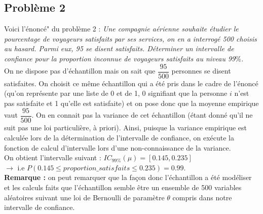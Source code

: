 \documentclass{article}      %
\begin{document}
\subsection{Problème 2}
Voici l'énoncé" du problème 2 : \textit{Une compagnie aérienne souhaite étudier le pourcentage de voyageurs satisfaits par ses services, on en a interrogé 500 choisis au hasard. Parmi eux, 95
se disent satisfaits. Déterminer un intervalle de confiance pour la proportion
inconnue de voyageurs satisfaits au niveau 99$\%$.}\\

On ne dispose pas d'échantillon mais on sait que $\dfrac{95}{500}$ personnes se disent satisfaites. On choisit ce même échantillon qui a été pris dans le cadre de l'énoncé (qu'on représente par une liste de 0 et de 1, 0 signifiant que la personne $i$ n'est pas satisfaite et 1 qu'elle est satisfaite) et on pose donc que la moyenne empirique vaut $\dfrac{95}{500}$. On en connait pas la variance de cet échantillon (étant donné qu'il ne suit pas une loi particulière, à priori). Ainsi, puisque la variance empirique est calculée lors de la détermination de l'intervalle de confiance, on exécute la fonction de calcul d'intervalle lors d'une non-connaissance de la variance.\\
On obtient l'intervalle suivant : $IC_{99\%}(\mu) = [0.145, 0.235]$ \\$\rightarrow$ i.e $P(0.145 \le proportion\_satisfaits \le 0.235) = 0.99$.\\
\newline
\textbf{Remarque :} on peut remarquer que la façon donc l'échantillon a été modéliser et les calculs faits que l'échantillon semble être un ensemble de 500 variables aléatoires suivant une loi de Bernoulli de paramètre $\theta$ compris dans notre intervalle de confiance.
\end{document}
